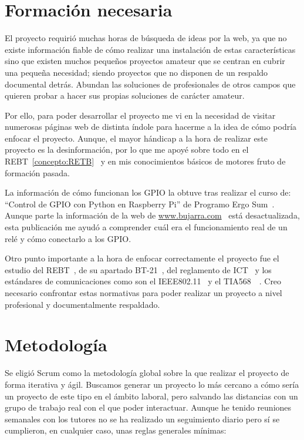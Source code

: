 \section{Formación necesaria}
El proyecto requirió muchas horas de búsqueda de ideas por la web, ya que no existe información fiable de cómo realizar una instalación de estas características sino que existen muchos pequeños proyectos amateur que se centran en cubrir una pequeña necesidad; siendo proyectos que no disponen de un respaldo documental detrás. Abundan las soluciones de profesionales de otros campos que quieren probar a hacer sus propias soluciones de carácter amateur.

Por ello, para poder desarrollar el proyecto me vi en la necesidad de visitar numerosas páginas web de distinta índole para hacerme a la idea de cómo podría enfocar el proyecto. Aunque, el mayor hándicap a la hora de realizar este proyecto es la desinformación, por lo que me apoyé sobre todo en el REBT~\ref{concepto:RETB}~\cite{manual:REBT} y en mis conocimientos básicos de motores fruto de formación pasada.

La información de cómo funcionan los GPIO la obtuve tras realizar el curso de: “Control de GPIO con Python en Raspberry Pi” de Programo Ergo Sum~\cite{misc:programoergosum}.
Aunque parte la información de la web de \url{www.bujarra.com}~\cite{misc:BujarraGPIO} está desactualizada, esta publicación me ayudó a comprender cuál era el funcionamiento real de un relé y cómo conectarlo a los GPIO.

Otro punto importante a la hora de enfocar correctamente el proyecto fue el estudio del REBT~\cite{manual:REBT}, de su apartado BT-21~\cite{manual:ICT-BT-21}, del reglamento de ICT~\cite{manual:ICT} y los estándares de comunicaciones como son el IEEE802.11~\cite{manual:IEEE802.11} y el TIA568~\cite{manual:568.1}~\cite{manual:568.2}. Creo necesario confrontar estas normativas para poder realizar un proyecto a nivel profesional y documentalmente respaldado.

\section{Metodología}
Se eligió Scrum como la metodología global sobre la que realizar el proyecto de forma iterativa y ágil. Buscamos generar un proyecto lo más cercano a cómo sería un proyecto de este tipo en el ámbito laboral, pero salvando las distancias con un grupo de trabajo real con el que poder interactuar. Aunque he tenido reuniones semanales con los tutores no se ha realizado un seguimiento diario pero sí se cumplieron, en cualquier caso, unas reglas generales mínimas:

